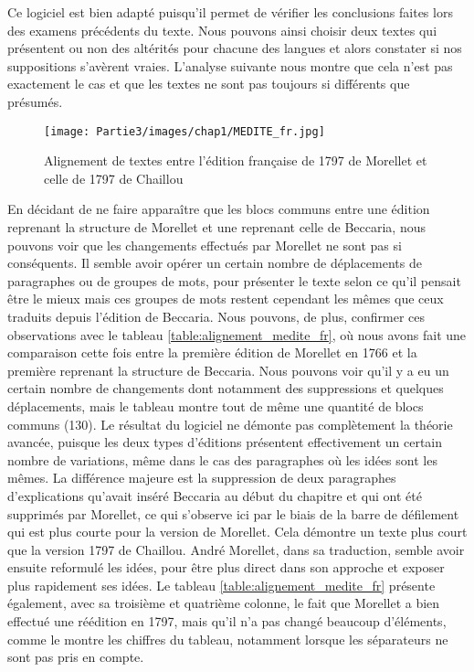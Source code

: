 Ce logiciel est bien adapté puisqu'il permet de vérifier les conclusions faites lors des examens précédents du texte. Nous pouvons ainsi choisir deux textes qui présentent ou non des altérités pour chacune des langues et alors constater si nos suppositions s'avèrent vraies. L'analyse suivante nous montre que cela n'est pas exactement le cas et que les textes ne sont pas toujours si différents que présumés.
\begin{figure}[H]
    \centering
    \texttt{[image: Partie3/images/chap1/MEDITE\_fr.jpg]}
    \caption{Alignement de textes entre l'édition française de 1797 de Morellet et celle de 1797 de Chaillou}
    \label{fig:medite_fr}
\end{figure}
En décidant de ne faire apparaître que les blocs communs entre une édition reprenant la structure de Morellet et une reprenant celle de Beccaria, nous pouvons voir que les changements effectués par Morellet ne sont pas si conséquents. Il semble avoir opérer un certain nombre de déplacements de paragraphes ou de groupes de mots, pour présenter le texte selon ce qu'il pensait être le mieux mais ces groupes de mots restent cependant les mêmes que ceux traduits depuis l'édition de Beccaria. Nous pouvons, de plus, confirmer ces observations avec le tableau \ref{table:alignement_medite_fr}, où nous avons fait une comparaison cette fois entre la première édition de Morellet en 1766 et la première reprenant la structure de Beccaria. Nous pouvons voir qu'il y a eu un certain nombre de changements dont notamment des suppressions et quelques déplacements, mais le tableau montre tout de même une quantité de blocs communs (130). Le résultat du logiciel ne démonte pas complètement la théorie avancée, puisque les deux types d'éditions présentent effectivement un certain nombre de variations, même dans le cas des paragraphes où les idées sont les mêmes. La différence majeure est la suppression de deux paragraphes d'explications qu'avait inséré Beccaria au début du chapitre et qui ont été supprimés par Morellet, ce qui s'observe ici par le biais de la barre de défilement qui est plus courte pour la version de Morellet. Cela démontre un texte plus court que la version 1797 de Chaillou. André Morellet, dans sa traduction, semble avoir ensuite reformulé les idées, pour être plus direct dans son approche et exposer plus rapidement ses idées. Le tableau \ref{table:alignement_medite_fr} présente également, avec sa troisième et quatrième colonne, le fait que Morellet a bien effectué une réédition en 1797, mais qu'il n'a pas changé beaucoup d'éléments, comme le montre les chiffres du tableau, notamment lorsque les séparateurs ne sont pas pris en compte. 

